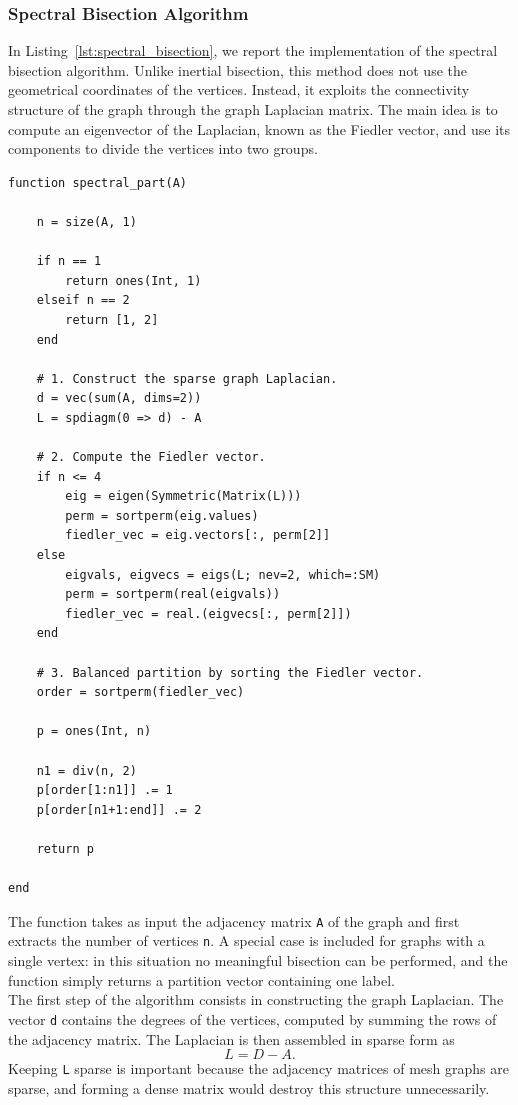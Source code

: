 \documentclass[unicode,10pt,a4paper,oneside,numbers=endperiod,openany]{scrartcl}
\begin{document}
\subsubsection{Spectral Bisection Algorithm}

In Listing~\ref{lst:spectral_bisection}, we report the implementation of the spectral bisection algorithm.
Unlike inertial bisection, this method does not use the geometrical coordinates of the vertices. Instead,
it exploits the connectivity structure of the graph through the graph Laplacian matrix. The main idea is
to compute an eigenvector of the Laplacian, known as the Fiedler vector, and use its components to divide
the vertices into two groups.

\begin{lstlisting}[style=grayverbatim, caption={Spectral Bisection algorithm}, label={lst:spectral_bisection}]
function spectral_part(A)

    n = size(A, 1)

    if n == 1
        return ones(Int, 1)
    elseif n == 2
        return [1, 2]
    end

    # 1. Construct the sparse graph Laplacian.
    d = vec(sum(A, dims=2))
    L = spdiagm(0 => d) - A

    # 2. Compute the Fiedler vector.
    if n <= 4
        eig = eigen(Symmetric(Matrix(L)))
        perm = sortperm(eig.values)
        fiedler_vec = eig.vectors[:, perm[2]]
    else
        eigvals, eigvecs = eigs(L; nev=2, which=:SM)
        perm = sortperm(real(eigvals))
        fiedler_vec = real.(eigvecs[:, perm[2]])
    end

    # 3. Balanced partition by sorting the Fiedler vector.
    order = sortperm(fiedler_vec)

    p = ones(Int, n)

    n1 = div(n, 2)
    p[order[1:n1]] .= 1
    p[order[n1+1:end]] .= 2

    return p

end
\end{lstlisting}
The function takes as input the adjacency matrix \texttt{A} of the graph and first extracts the number
of vertices \texttt{n}. A special case is included for graphs with a single vertex: in this situation no
meaningful bisection can be performed, and the function simply returns a partition vector containing
one label.\\

The first step of the algorithm consists in constructing the graph Laplacian. The vector \texttt{d}
contains the degrees of the vertices, computed by summing the rows of the adjacency matrix. The
Laplacian is then assembled in sparse form as
\[
L = D - A.
\]
Keeping \texttt{L} sparse is important because the adjacency matrices of mesh graphs are sparse, and
forming a dense matrix would destroy this structure unnecessarily.\\
\end{document}
